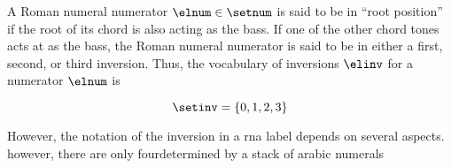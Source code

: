 
A Roman numeral numerator $\elnum \in \setnum$ is said to be
in ``root position'' if the root of its chord is also acting
as the bass. If one of the other chord tones acts at as the
bass, the Roman numeral numerator is said to be in either a
first, second, or third inversion. Thus, the vocabulary of
inversions $\elinv$ for a numerator $\elnum$ is 

\begin{equation}
    \label{eq:inversion_vocabulary}
    \setinv = \{ 0, 1, 2, 3 \}
\end{equation}


However, the notation of the inversion in a \gls{rna} label
depends on several aspects. however, there are only
fourdetermined by a stack of arabic numerals


        

